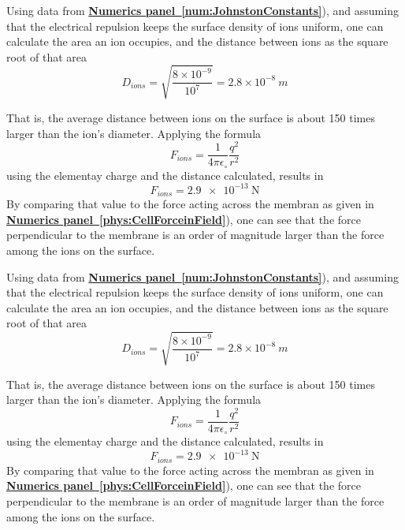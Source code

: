 \ifx\magyar\undefined
{}
{
Using data from 
\textbf{\hyperlink{num:JohnstonConstants}{Numerics panel~\ref{num:JohnstonConstants}}}), and assuming that 
the electrical repulsion keeps the surface density of ions uniform, one can calculate the area an ion occupies, and the distance between ions as the square root of that area
\[
D_{ions} = \sqrt{\frac{8\times 10^{-9}}{10^7}} = 2.8\times 10^{-8}\ m
\]

That is, the average distance between ions on the surface
is about 150 times larger than the ion's diameter.
Applying the formula
\[
F_{ions}= \frac{1}{4\pi\epsilon_\circ}\frac{q^2}{r^2}
\]
using the elementay charge and the distance calculated,
results in
\[
F_{ions}= \SI{2.9e-13}{\newton}
\]
By comparing that value to the force acting across
the membran as given in \textbf{\hyperlink{phys:CellForceinField}{Numerics panel~\ref{phys:CellForceinField}}}),
one can see that the force perpendicular to the membrane is an order of magnitude larger than
the force among the ions on the surface.
}
%
\else
%
{
Using data from 
\textbf{\hyperlink{num:JohnstonConstants}{Numerics panel~\ref{num:JohnstonConstants}}}), and assuming that 
the electrical repulsion keeps the surface density of ions uniform, one can calculate the area an ion occupies, and the distance between ions as the square root of that area
\[
D_{ions} = \sqrt{\frac{8\times 10^{-9}}{10^7}} = 2.8\times 10^{-8}\ m
\]

That is, the average distance between ions on the surface
is about 150 times larger than the ion's diameter.
Applying the formula
\[
F_{ions}= \frac{1}{4\pi\epsilon_\circ}\frac{q^2}{r^2}
\]
using the elementay charge and the distance calculated,
results in
\[
F_{ions}= \SI{2.9e-13}{\newton}
\]
By comparing that value to the force acting across
the membran as given in \textbf{\hyperlink{phys:CellForceinField}{Numerics panel~\ref{phys:CellForceinField}}}),
one can see that the force perpendicular to the membrane is an order of magnitude larger than
the force among the ions on the surface.
}
\fi


